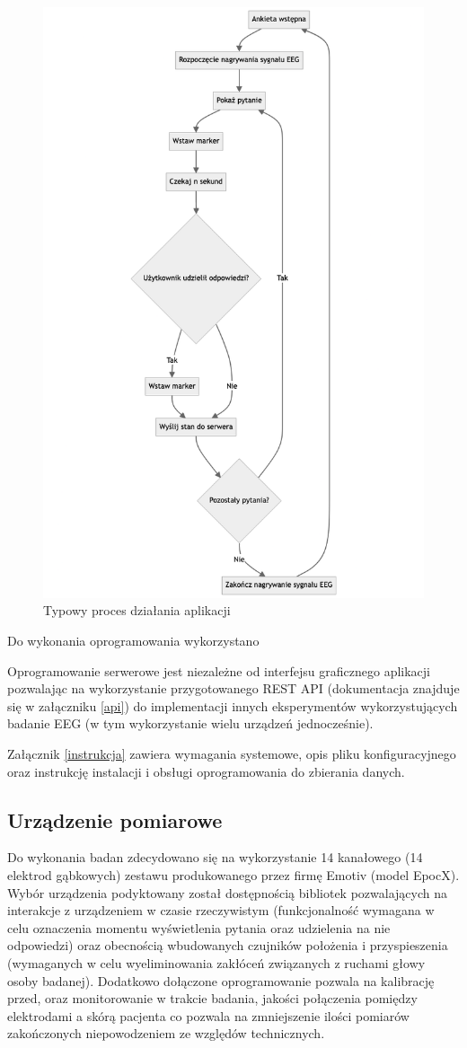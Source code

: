 \documentclass{./assets/wfis}
\begin{document}
\begin{figure}[h!]
    \centering
    \includegraphics[width=0.5\columnwidth]{thesis/assets/app_flow_diagram.png}
    \caption{Typowy proces działania aplikacji}
    \label{fig:app-flow}
\end{figure}

Do wykonania oprogramowania wykorzystano

Oprogramowanie serwerowe jest niezależne od interfejsu graficznego aplikacji pozwalając na wykorzystanie przygotowanego REST API (dokumentacja znajduje się w załączniku \ref{api}) do implementacji innych eksperymentów wykorzystujących badanie EEG (w tym wykorzystanie wielu urządzeń jednocześnie).

Załącznik \ref{instrukcja} zawiera wymagania systemowe, opis pliku konfiguracyjnego oraz instrukcję instalacji i obsługi oprogramowania do zbierania danych.

\subsection{Urządzenie pomiarowe}\label{emotiv}
Do wykonania badan zdecydowano się na wykorzystanie 14 kanałowego (14 elektrod gąbkowych)  zestawu produkowanego przez firmę Emotiv (model EpocX). Wybór urządzenia podyktowany został dostępnością bibliotek pozwalających na interakcje z urządzeniem w czasie rzeczywistym (funkcjonalność wymagana w celu oznaczenia momentu wyświetlenia pytania oraz udzielenia na nie odpowiedzi) oraz obecnością wbudowanych czujników położenia i przyspieszenia (wymaganych w celu wyeliminowania zakłóceń związanych z ruchami głowy osoby badanej). Dodatkowo dołączone oprogramowanie pozwala na kalibrację przed, oraz monitorowanie w trakcie badania, jakości połączenia pomiędzy elektrodami a skórą pacjenta co pozwala na zmniejszenie ilości pomiarów zakończonych niepowodzeniem ze względów technicznych.
\end{document}
